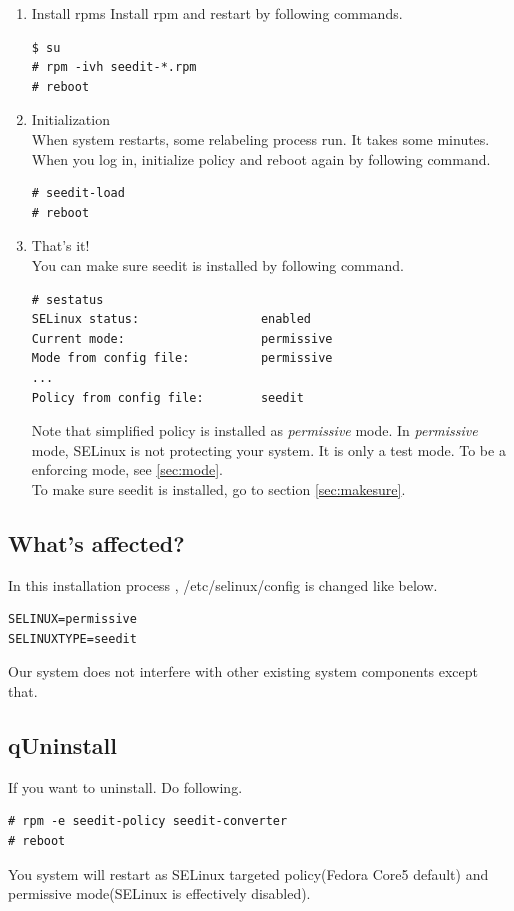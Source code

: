 \documentclass{article}
\begin{document}
\begin{enumerate}
 \item Install rpms
Install rpm and restart by following commands.
\begin{verbatim}
$ su 
# rpm -ivh seedit-*.rpm
# reboot
\end{verbatim}
 \item Initialization\\ \label{item:init}
When system restarts, some relabeling process run. It takes some
	  minutes. When you log in, initialize policy and reboot again by following
	  command.
\begin{verbatim}
# seedit-load
# reboot
\end{verbatim}
 \item That's it!\\
You can make sure seedit is installed by following command.
\begin{verbatim}
# sestatus
SELinux status:                 enabled
Current mode:                   permissive
Mode from config file:          permissive
...
Policy from config file:        seedit
\end{verbatim}
Note that simplified policy is installed as {\it permissive} mode.
In {\it permissive} mode, SELinux is not protecting your system. It is
 only a test mode. To be a enforcing mode, see \ref{sec:mode}.\\
To make sure seedit is installed, go to section \ref{sec:makesure}.
\end{enumerate}

 \subsection{What's affected?}
 In this installation process ,
/etc/selinux/config is changed like below.
\begin{verbatim}
SELINUX=permissive	
SELINUXTYPE=seedit
\end{verbatim}
Our system does not interfere with other existing system components
except that.
\subsection{qUninstall}
If you want to uninstall. Do following.
\begin{verbatim}
# rpm -e seedit-policy seedit-converter	
# reboot
\end{verbatim}
You system will restart as SELinux targeted policy(Fedora Core5 default)
and permissive mode(SELinux is effectively disabled).
\end{document}
